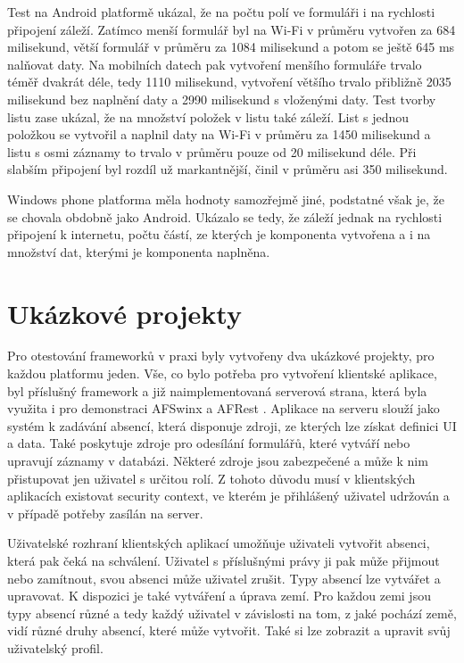 Test na Android platformě ukázal, že na počtu polí ve formuláři i na rychlosti připojení záleží. Zatímco menší formulář byl na Wi-Fi v průměru vytvořen za 684 milisekund, větší formulář v průměru za 1084 milisekund a potom se ještě 645 ms nalňovat daty. Na mobilních datech pak vytvoření menšího formuláře trvalo téměř dvakrát déle, tedy 1110 milisekund, vytvoření většího trvalo přibližně 2035 milisekund bez naplnění daty a 2990 milisekund s vloženými daty. Test tvorby listu zase ukázal, že na množství položek v listu také záleží. List s jednou položkou se vytvořil a naplnil daty na Wi-Fi v průměru za 1450 milisekund a listu s osmi záznamy to trvalo v průměru pouze od 20 milisekund déle. Při slabším připojení byl rozdíl už markantnější, činil v průměru asi 350 milisekund.

Windows phone platforma měla hodnoty samozřejmě jiné, podstatné však je, že se chovala obdobně jako Android. Ukázalo se tedy, že záleží jednak na rychlosti připojení k internetu, počtu částí, ze kterých je komponenta vytvořena a i na množství dat, kterými je komponenta naplněna.

\section{Ukázkové projekty}
Pro otestování frameworků v praxi byly vytvořeny dva ukázkové projekty, pro každou platformu jeden. Vše, co bylo potřeba pro vytvoření klientské aplikace, byl příslušný framework a již naimplementovaná serverová strana, která byla využita i pro demonstraci AFSwinx a AFRest \cite{tomasek-thesis}. Aplikace na serveru slouží jako systém k zadávání absencí, která disponuje zdroji, ze kterých lze získat definici UI a data. Také poskytuje zdroje pro odesílání formulářů, které vytváří nebo upravují záznamy v databázi. Některé zdroje jsou zabezpečené a může k nim přistupovat jen uživatel s určitou rolí. Z tohoto důvodu musí v klientských aplikacích existovat security context, ve kterém je přihlášený uživatel udržován a v případě potřeby zasílán na server. 

Uživatelské rozhraní klientských aplikací umožňuje uživateli vytvořit absenci, která pak čeká na schválení. Uživatel s příslušnými právy ji pak může přijmout nebo zamítnout, svou absenci může uživatel zrušit. Typy absencí lze vytvářet a upravovat. K dispozici je také vytváření a úprava zemí. Pro každou zemi jsou typy absencí různé a tedy každý uživatel v závislosti na tom, z jaké pochází země, vidí různé druhy absencí, které může vytvořit. Také si lze zobrazit a upravit svůj uživatelský profil.

